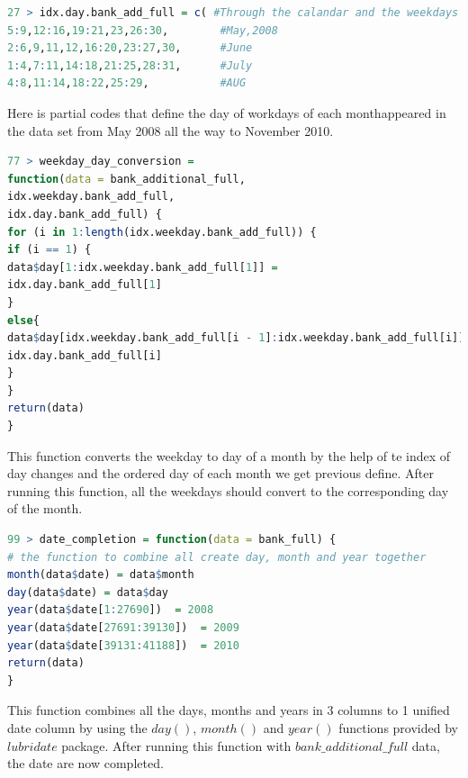 \documentclass[12pt, a4paper, bibliography=totoc, english]{scrartcl}
\begin{document}
\begin{lstlisting}[language = R]
27 > idx.day.bank_add_full = c( #Through the calandar and the weekdays we will be able to identify the exact day of the month of each row
5:9,12:16,19:21,23,26:30,        #May,2008
2:6,9,11,12,16:20,23:27,30,      #June
1:4,7:11,14:18,21:25,28:31,      #July
4:8,11:14,18:22,25:29,           #AUG
\end{lstlisting}
Here is partial codes that define the day of workdays of each monthappeared in the data set from May 2008 all the way to November 2010.

\begin{lstlisting}[language = R]
77 > weekday_day_conversion =
function(data = bank_additional_full,
idx.weekday.bank_add_full,
idx.day.bank_add_full) {
for (i in 1:length(idx.weekday.bank_add_full)) {
if (i == 1) {
data$day[1:idx.weekday.bank_add_full[1]] =
idx.day.bank_add_full[1]
}
else{
data$day[idx.weekday.bank_add_full[i - 1]:idx.weekday.bank_add_full[i]] =
idx.day.bank_add_full[i]
}
}
return(data)
}
\end{lstlisting}
This function converts the weekday to day of a month by the help of te index of day changes and the ordered day of each month we get previous define. After running this function, all the weekdays should convert to the corresponding day of the month.

\begin{lstlisting}[language = R]
99 > date_completion = function(data = bank_full) {
# the function to combine all create day, month and year together
month(data$date) = data$month
day(data$date) = data$day
year(data$date[1:27690])  = 2008
year(data$date[27691:39130])  = 2009
year(data$date[39131:41188])  = 2010
return(data)
}
\end{lstlisting}
This function combines all the days, months and years in 3 columns to 1 unified date column by using the $day()$, $month()$ and $year()$ functions provided by $lubridate$ package. After running this function with $bank\_additional\_full$ data, the date are now completed.
\end{document}

